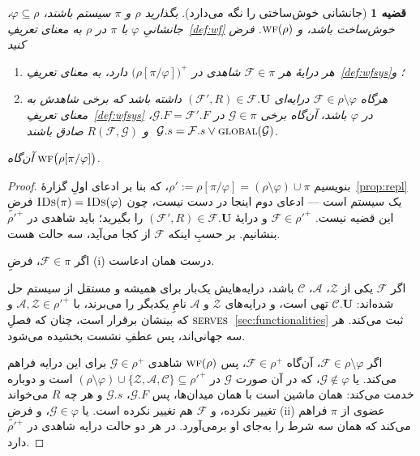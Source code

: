 \documentclass[10pt,oneside,openany]{book}
\newcommand{\uses}{\mathbf{U}}
\newcommand{\serves}{\op{serves}}
\newcommand{\WF}{\op{wf}}
\newcommand{\Corr}{\mathcal{C}}
\newcommand{\F}{\mathcal{F}}
\newcommand{\G}{\mathcal{G}}
\newcommand{\Zenv}{\mathcal{Z}}
\newcommand{\Adv}{\mathcal{A}}
\newcommand{\op}[1]{\textnormal{\textsc{#1}}}
\newcommand{\IDs}{\op{IDs}}
\theoremstyle{accentdef}
\theoremstyle{accentplain}
\newtheorem{theorem}[definition]{قضیه}
\begin{document}
\begin{theorem}[جانشانی خوش‌ساختی را نگه می‌دارد]\label{thm:wfrepl}
بگذارید $\rho$ و $\pi$ سیستم باشند، $\varphi \subseteq \rho$، جانشانیِ
$\varphi$ با $\pi$ در $\rho$ به معنای تعریفِ~\ref{def:wf} خوش‌ساخت باشد، و
$\WF(\rho)$. فرض کنید
\begin{enumerate}[label=(\roman*),leftmargin=2.2em]
  \item هر درایهٔ هر $\F \in \pi$ شاهدی در $\bigl(\rho[\pi/\varphi]\bigr)^{+}$ دارد،
        به معنای تعریفِ~\ref{def:wfsys}؛ و
  \item هرگاه $\F \in \rho \setminus \varphi$ درایه‌ای $(\F',R) \in \F.\uses$ داشته باشد که
        \emph{برخی} شاهدش به معنای تعریفِ~\ref{def:wfsys} در $\varphi$ باشد، آن‌گاه برخی
        $\G \in \pi$ در $\G.F = \F'.F$، $\ \G.s = \F.s \vee \op{global}(\G)$ و $R(\F,\G)$
        صادق باشند.
\end{enumerate}
آن‌گاه $\WF\bigl(\rho[\pi/\varphi]\bigr)$.
\end{theorem}

\begin{proof}
بنویسیم $\rho' := \rho[\pi/\varphi] = (\rho \setminus \varphi) \cup \pi$،
که بنا بر ادعای اولِ گزارهٔ~\ref{prop:repl} یک سیستم است --- ادعای دوم
اینجا در دست نیست، چون $\IDs(\pi) = \IDs(\varphi)$ فرضِ این قضیه نیست.
$\F \in \rho'^{+}$ و درایهٔ $(\F',R) \in \F.\uses$ را بگیرید؛ باید شاهدی
در $\rho'^{+}$ بنشانیم. بر حسبِ اینکه $\F$ از کجا می‌آید، سه حالت هست.

اگر $\F \in \pi$، فرضِ (i) درست همان ادعاست.

اگر $\F$ یکی از $\Zenv$، $\Adv$، $\Corr$ باشد، درایه‌هایش یک‌بار برای
همیشه و مستقل از سیستم حل شده‌اند: $\Corr.\uses$ تهی است، و درایه‌های
$\Zenv$ و $\Adv$ نامِ یکدیگر را می‌برند، با $\Adv, \Zenv \in \rho'^{+}$ و
$\serves$ که بینشان برقرار است، چنان که فصلِ~\ref{sec:functionalities}
ثبت می‌کند. هر سه جهانی‌اند، پس عطفِ نشست بخشیده می‌شود.

اگر $\F \in \rho \setminus \varphi$، آن‌گاه $\F \in \rho^{+}$، پس
$\WF(\rho)$ شاهدی $\G \in \rho^{+}$ برای این درایه فراهم می‌کند. یا $\G
\notin \varphi$، که در آن صورت $\G$ در $(\rho \setminus \varphi) \cup
\{\Zenv,\Adv,\Corr\} \subseteq \rho'^{+}$ است و دوباره خدمت می‌کند: همان
ماشین است با همان میدان‌ها، پس $\G.F$، $\G.s$ و هر چه $R$ می‌خواند تغییر
نکرده، و $\F$ هم تغییر نکرده است. یا $\G \in \varphi$، و فرضِ (ii) عضوی از
$\pi$ فراهم می‌کند که همان سه شرط را به‌جای او برمی‌آورد. در هر دو حالت
درایه شاهدی در $\rho'^{+}$ دارد.
\end{proof}
\end{document}
